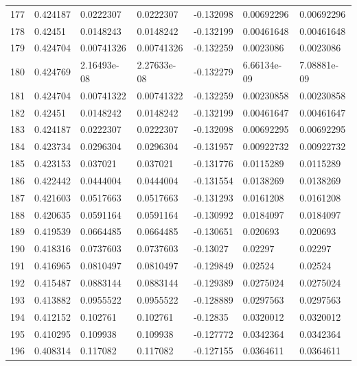 \begin{longtable}{l|lll|lll}
 177 &  0.424187    & 0.0222307   & 0.0222307   & -0.132098    & 0.00692296  & 0.00692296  \\
 178 &  0.42451     & 0.0148243   & 0.0148242   & -0.132199    & 0.00461648  & 0.00461648  \\
 179 &  0.424704    & 0.00741326  & 0.00741326  & -0.132259    & 0.0023086   & 0.0023086   \\
 180 &  0.424769    & 2.16493e-08 & 2.27633e-08 & -0.132279    & 6.66134e-09 & 7.08881e-09 \\
 181 &  0.424704    & 0.00741322  & 0.00741322  & -0.132259    & 0.00230858  & 0.00230858  \\
 182 &  0.42451     & 0.0148242   & 0.0148242   & -0.132199    & 0.00461647  & 0.00461647  \\
 183 &  0.424187    & 0.0222307   & 0.0222307   & -0.132098    & 0.00692295  & 0.00692295  \\
 184 &  0.423734    & 0.0296304   & 0.0296304   & -0.131957    & 0.00922732  & 0.00922732  \\
 185 &  0.423153    & 0.037021    & 0.037021    & -0.131776    & 0.0115289   & 0.0115289   \\
 186 &  0.422442    & 0.0444004   & 0.0444004   & -0.131554    & 0.0138269   & 0.0138269   \\
 187 &  0.421603    & 0.0517663   & 0.0517663   & -0.131293    & 0.0161208   & 0.0161208   \\
 188 &  0.420635    & 0.0591164   & 0.0591164   & -0.130992    & 0.0184097   & 0.0184097   \\
 189 &  0.419539    & 0.0664485   & 0.0664485   & -0.130651    & 0.020693    & 0.020693    \\
 190 &  0.418316    & 0.0737603   & 0.0737603   & -0.13027     & 0.02297     & 0.02297     \\
 191 &  0.416965    & 0.0810497   & 0.0810497   & -0.129849    & 0.02524     & 0.02524     \\
 192 &  0.415487    & 0.0883144   & 0.0883144   & -0.129389    & 0.0275024   & 0.0275024   \\
 193 &  0.413882    & 0.0955522   & 0.0955522   & -0.128889    & 0.0297563   & 0.0297563   \\
 194 &  0.412152    & 0.102761    & 0.102761    & -0.12835     & 0.0320012   & 0.0320012   \\
 195 &  0.410295    & 0.109938    & 0.109938    & -0.127772    & 0.0342364   & 0.0342364   \\
 196 &  0.408314    & 0.117082    & 0.117082    & -0.127155    & 0.0364611   & 0.0364611   \\

\end{longtable}
